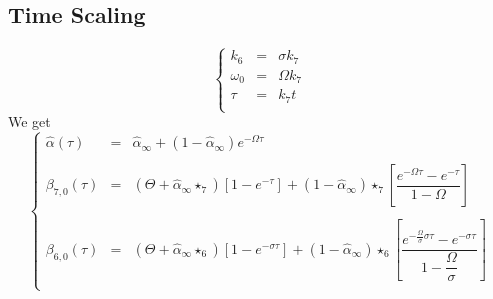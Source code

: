 \documentclass[aps,onecolumn,12pt]{revtex4}
\begin{document}
\subsection{Time Scaling}
\begin{equation}
\left\lbrace
\begin{array}{rcl}
	k_6      & = & \sigma k_7\\
	\omega_0 & = & \Omega k_7\\
	\tau     & = & k_7 t\\
\end{array}
\right.
\end{equation}
We get
\begin{equation}
\left\lbrace
\begin{array}{rcl}
	\hat\alpha(\tau)  & = & \hat\alpha_\infty + \left(1-\hat\alpha_\infty\right) e^{-\Omega \tau}\\
	\\
	\beta_{7,0}(\tau) & = & \left( \Theta + \hat\alpha_\infty \star_7 \right)  \left[1-e^{-\tau}\right]
	+ \left(1-\hat\alpha_\infty\right) \star_7 \left[\dfrac{e^{-\Omega\tau} - e^{-\tau}}{1-\Omega}\right]\\
	\\
	\beta_{6,0}(\tau) & = & \left( \Theta + \hat\alpha_\infty \star_6 \right)  \left[1-e^{-\sigma\tau}\right]
	+ \left(1-\hat\alpha_\infty\right) \star_6 \left[\dfrac{e^{-\frac{\Omega}{\sigma}\sigma\tau} - e^{-\sigma\tau}}{1-\dfrac{\Omega}{\sigma}}\right]\\
\end{array}
\right.
\end{equation}
\end{document}
